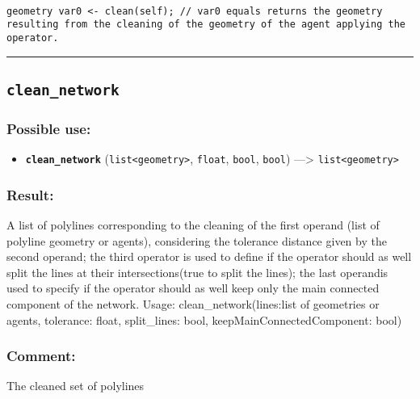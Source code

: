 \documentclass[]{book}
\providecommand{\tightlist}{%
  \setlength{\itemsep}{0pt}\setlength{\parskip}{0pt}}
\theoremstyle{definition}
\theoremstyle{definition}
\theoremstyle{definition}
\theoremstyle{remark}
\begin{document}
\begin{verbatim}
 
geometry var0 <- clean(self); // var0 equals returns the geometry resulting from the cleaning of the geometry of the agent applying the operator.
\end{verbatim}

\begin{center}\rule{0.5\linewidth}{\linethickness}\end{center}

\subsection{\texorpdfstring{\texttt{clean\_network}}{clean\_network}}\label{clean_network}

\subsubsection{Possible use:}\label{possible-use-87}

\begin{itemize}
\tightlist
\item
  \textbf{\texttt{clean\_network}}
  (\texttt{list\textless{}geometry\textgreater{}}, \texttt{float},
  \texttt{bool}, \texttt{bool}) ---\textgreater{}
  \texttt{list\textless{}geometry\textgreater{}}
\end{itemize}

\subsubsection{Result:}\label{result-85}

A list of polylines corresponding to the cleaning of the first operand
(list of polyline geometry or agents), considering the tolerance
distance given by the second operand; the third operator is used to
define if the operator should as well split the lines at their
intersections(true to split the lines); the last operandis used to
specify if the operator should as well keep only the main connected
component of the network. Usage: clean\_network(lines:list of geometries
or agents, tolerance: float, split\_lines: bool,
keepMainConnectedComponent: bool)

\subsubsection{Comment:}\label{comment-19}

The cleaned set of polylines
\end{document}
